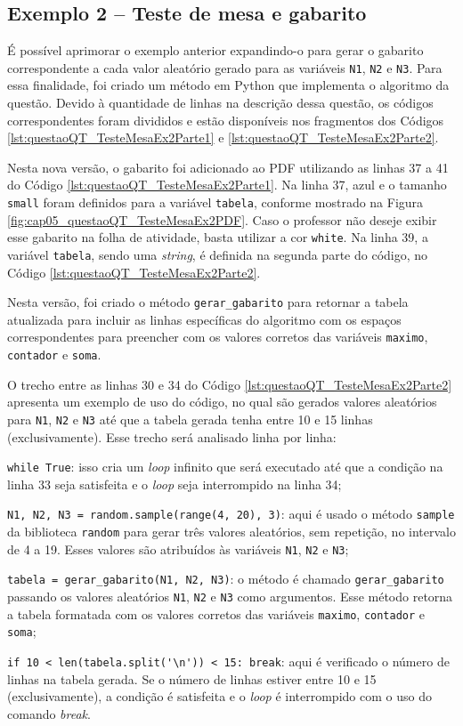 \subsection{Exemplo 2 -- Teste de mesa e gabarito}

É possível aprimorar o exemplo anterior expandindo-o para gerar o gabarito correspondente a cada valor aleatório gerado para as variáveis \verb|N1|, \verb|N2| e \verb|N3|. Para essa finalidade, foi criado um método em Python que implementa o algoritmo da questão. Devido à quantidade de linhas na descrição dessa questão, os códigos correspondentes foram divididos e estão disponíveis nos fragmentos dos Códigos \ref{lst:questaoQT_TesteMesaEx2Parte1} e  \ref{lst:questaoQT_TesteMesaEx2Parte2}.

Nesta nova versão, o gabarito foi adicionado ao PDF utilizando as linhas 37 a 41 do Código \ref{lst:questaoQT_TesteMesaEx2Parte1}. Na linha 37, azul e o tamanho \verb|small| foram definidos para a variável \verb|tabela|, conforme mostrado na Figura \ref{fig:cap05_questaoQT_TesteMesaEx2PDF}. Caso o professor não deseje exibir esse gabarito na folha de atividade, basta utilizar a cor \verb|white|. Na linha 39, a variável \verb|tabela|, sendo uma \textit{string}, é definida na segunda parte do código, no Código \ref{lst:questaoQT_TesteMesaEx2Parte2}.

Nesta versão, foi criado o método \verb|gerar_gabarito| para retornar a tabela atualizada para incluir as linhas específicas do algoritmo com os espaços correspondentes para preencher com os valores corretos das variáveis \verb|maximo|, \verb|contador| e \verb|soma|. 

O trecho entre as linhas 30 e 34 do Código \ref{lst:questaoQT_TesteMesaEx2Parte2} apresenta um exemplo de uso do código, no qual são gerados valores aleatórios para \verb|N1|, \verb|N2| e \verb|N3| até que a tabela gerada tenha entre 10 e 15 linhas (exclusivamente). Esse trecho será analisado linha por linha:

\begin{description}
    \item \verb|while True|: isso cria um \textit{loop} infinito que será executado até que a condição na linha 33 seja satisfeita e o \textit{loop} seja interrompido na linha 34;
    \item \verb|N1, N2, N3 = random.sample(range(4, 20), 3)|: aqui é usado o método \verb|sample| da biblioteca \verb|random| para gerar três valores aleatórios, sem repetição, no intervalo de 4 a 19. Esses valores são atribuídos às variáveis \verb|N1|, \verb|N2| e \verb|N3|;
    \item \verb|tabela = gerar_gabarito(N1, N2, N3)|: o método é chamado \verb|gerar_gabarito| passando os valores aleatórios \verb|N1|, \verb|N2| e \verb|N3| como argumentos. Esse método retorna a tabela formatada com os valores corretos das variáveis \verb|maximo|, \verb|contador| e \verb|soma|;
    \item \verb|if 10 < len(tabela.split('\n')) < 15: break|: aqui é verificado o número de linhas na tabela gerada. Se o número de linhas estiver entre 10 e 15 (exclusivamente), a condição é satisfeita e o \textit{loop} é interrompido com o uso do comando \textit{break}.
\end{description}

